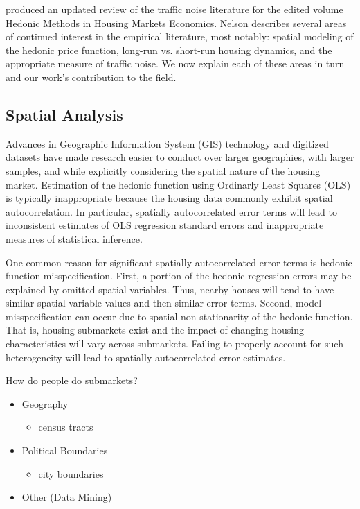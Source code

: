 \documentclass{article}\usepackage{graphicx, color}
\begin{document}
\citet{Nelson2008} produced an updated review of the traffic noise literature for the edited volume \underline{Hedonic Methods in Housing Markets Economics}. Nelson describes several areas of continued interest in the empirical literature, most notably: spatial modeling of the hedonic price function, long-run vs. short-run housing dynamics, and the appropriate measure of traffic noise. We now explain each of these areas in turn and our work's contribution to the field.

\subsection{Spatial Analysis}
Advances in Geographic Information System (GIS) technology and digitized datasets have made research easier to conduct over larger geographies, with larger samples, and while explicitly considering the spatial nature of the housing market. Estimation of the hedonic function using Ordinarly Least Squares (OLS) is typically inappropriate because the housing data commonly exhibit spatial autocorrelation. In particular, spatially autocorrelated error terms will lead to inconsistent estimates of OLS regression standard errors and inappropriate measures of statistical inference. 

One common reason for significant spatially autocorrelated error terms is hedonic function misspecification. First, a portion of the hedonic regression errors may be explained by omitted spatial variables. Thus, nearby houses will tend to have similar spatial variable values and then similar error terms. Second, model misspecification can occur due to spatial non-stationarity of the hedonic function. That is, housing submarkets exist and the impact of changing housing characteristics will vary across submarkets. Failing to properly account for such heterogeneity will lead to spatially autocorrelated error estimates.

How do people do submarkets? 
\begin{itemize}
  \item Geography 
    \begin{itemize}
      \item census tracts
    \end{itemize}
  \item Political Boundaries
    \begin{itemize}
      \item city boundaries
    \end{itemize}
  \item Other (Data Mining)
\end{itemize}
\end{document}
